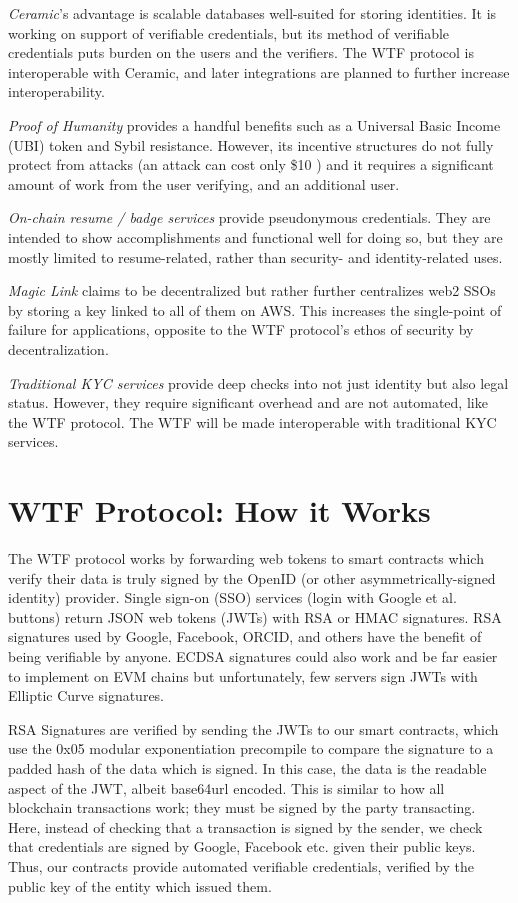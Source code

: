 \documentclass[11pt,oneside,a4paper]{article}
\begin{document}
	\textit{Ceramic}'s advantage is scalable databases well-suited for storing identities. It is working on support of verifiable credentials, but its method of verifiable credentials puts burden on the users and the verifiers. The WTF protocol is interoperable with Ceramic, and later integrations are planned to further increase interoperability.
	
	\textit{Proof of Humanity} provides a handful benefits such as a Universal Basic Income (UBI) token and Sybil resistance. However, its incentive structures do not fully protect from attacks (an attack can cost only \$10 \cite{ted}) and it requires a significant amount of work from the user verifying, and an additional user. 
	
	\textit{On-chain resume / badge services} provide pseudonymous credentials. They are intended to show accomplishments and functional well for doing so, but they are mostly limited to resume-related, rather than security- and identity-related uses.
	
	\textit{Magic Link} claims to be decentralized but rather further centralizes web2 SSOs by storing a key linked to all of them on AWS. This increases the single-point of failure for applications, opposite to the WTF protocol's ethos of security by decentralization.
	
	\textit{Traditional KYC services} provide deep checks into not just identity but also legal status. However, they require significant overhead and are not automated, like the WTF protocol. The WTF will be made interoperable with traditional KYC services.
	
	\section{WTF Protocol: How it Works}
	
		The WTF protocol works by forwarding web tokens to smart contracts which verify their data is truly signed by the OpenID (or other asymmetrically-signed identity) provider. Single sign-on (SSO) services (login with Google et al. buttons) return JSON web tokens (JWTs) with RSA or HMAC signatures. RSA signatures used by Google, Facebook, ORCID, and others have the benefit of being verifiable by anyone. ECDSA signatures could also work and be far easier to implement on EVM chains but unfortunately, few servers sign JWTs with Elliptic Curve signatures. 
		
		RSA Signatures are verified by sending the JWTs to our smart contracts, which use the 0x05 modular exponentiation precompile to compare the signature to a padded hash of the data which is signed. In this case, the data is the readable aspect of the JWT, albeit base64url encoded. This is similar to how all blockchain transactions work; they must be signed by the party transacting. Here, instead of checking that a transaction is signed by the sender, we check that credentials are signed by Google, Facebook etc. given their public keys. Thus, our contracts provide automated verifiable credentials, verified by the public key of the entity which issued them. 
		
\end{document}
